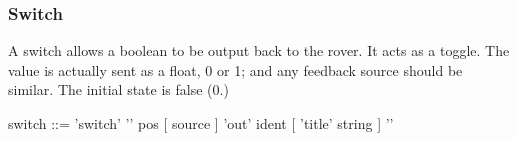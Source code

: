 \subsubsection{Switch}
A switch allows a boolean to be output back to the rover. It acts
as a toggle. The value is actually sent as a float, 0 or 1; and any
feedback source should be similar. The initial state is false (0.)

\begin{v}
switch      ::= 'switch' '{'
                pos
                [ source ]
                'out' ident
                [ 'title' string ]
                '}'                
\end{v}
